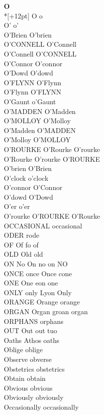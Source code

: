 \vspace{14pt}
\noindent\textbf{\Large O}\\*[+12pt]
O o\\
O' o'\\
O'Brien O'brien\\
O'CONNELL O'Connell\\
O'Connell O'CONNELL\\
O'Connor O'connor\\
O'Dowd O'dowd\\
O'FLYNN O'Flynn\\
O'Flynn O'FLYNN\\
O'Gaunt o'Gaunt\\
O'MADDEN O'Madden\\
O'MOLLOY O'Molloy\\
O'Madden O'MADDEN\\
O'Molloy O'MOLLOY\\
O'ROURKE O'Rourke O'rourke\\
O'Rourke O'rourke O'ROURKE\\
O'brien O'Brien\\
O'clock o'clock\\
O'connor O'Connor\\
O'dowd O'Dowd\\
O'er o'er\\
O'rourke O'ROURKE O'Rourke\\
OCCASIONAL occasional\\
ODER rode\\
OF Of fo of\\
OLD Old old\\
ON No On no on NO\\
ONCE once Once cone\\
ONE One eon one\\
ONLY only Lyon Only\\
ORANGE Orange orange\\
ORGAN Organ groan organ\\
ORPHANS orphans\\
OUT Out out tuo\\
Oaths Athos oaths\\
Oblige oblige\\
Observe obverse\\
Obstetrics obstetrics\\
Obtain obtain\\
Obvious obvious\\
Obviously obviously\\
Occasionally occasionally\\
